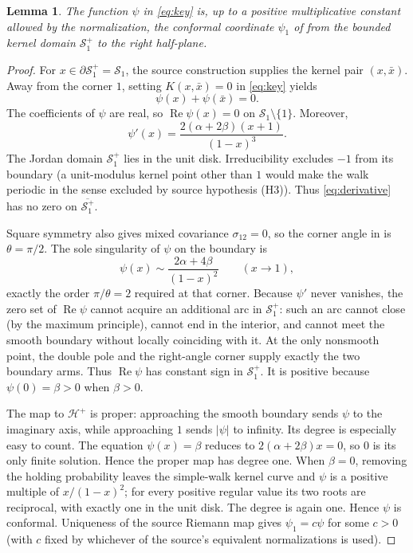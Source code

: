 \documentclass[10pt]{article}
\newtheorem{lemma}{Lemma}
\newcommand{\Sdom}{\mathcal S_1^+}
\begin{document}
\begin{lemma}\label{lem:psi}
The function $\psi$ in \eqref{eq:key} is, up to a positive multiplicative
constant allowed by the normalization, the conformal coordinate $\psi_1$ of
\cite{HRT} from the bounded kernel domain $\Sdom$ to the right half-plane.
\end{lemma}

\begin{proof}
For $x\in\partial\Sdom=\mathcal S_1$, the source construction supplies the
kernel pair $(x,\bar x)$.  Away from the corner $1$, setting $K(x,\bar x)=0$
in \eqref{eq:key} yields
\[
 \psi(x)+\psi(\bar x)=0.
\]
The coefficients of $\psi$ are real, so $\operatorname{Re}\psi(x)=0$ on
$\mathcal S_1\setminus\{1\}$.  Moreover,
\begin{equation}\label{eq:derivative}
 \psi'(x)=\frac{2(\alpha+2\beta)(x+1)}{(1-x)^3}.
\end{equation}
The Jordan domain $\Sdom$ lies in the unit disk.  Irreducibility excludes
$-1$ from its boundary (a unit-modulus kernel point other than $1$ would make
the walk periodic in the sense excluded by source hypothesis (H3)).  Thus
\eqref{eq:derivative} has no zero on $\overline{\Sdom}$.

Square symmetry also gives mixed covariance $\sigma_{12}=0$, so the corner
angle in \cite[(1.16)]{HRT} is $\theta=\pi/2$.  The sole singularity of $\psi$
on the boundary is
\[
 \psi(x)\sim\frac{2\alpha+4\beta}{(1-x)^2}\qquad(x\to1),
\]
exactly the order $\pi/\theta=2$ required at that corner.  Because $\psi'$
never vanishes, the zero set of $\operatorname{Re}\psi$ cannot acquire an
additional arc in $\Sdom$: such an arc cannot close (by the maximum
principle), cannot end in the interior, and cannot meet the smooth boundary
without locally coinciding with it.  At the only nonsmooth point, the double
pole and the right-angle corner supply exactly the two boundary arms.  Thus
$\operatorname{Re}\psi$ has constant sign in $\Sdom$.  It is positive because
$\psi(0)=\beta>0$ when $\beta>0$.

The map to $\mathcal H^+$ is proper: approaching the smooth boundary sends
$\psi$ to the imaginary axis, while approaching $1$ sends $|\psi|$ to
infinity.  Its degree is especially easy to count.  The equation
$\psi(x)=\beta$ reduces to $2(\alpha+2\beta)x=0$, so $0$ is its only finite
solution.  Hence the proper map has degree one.  When $\beta=0$, removing the
holding probability leaves the simple-walk kernel curve and $\psi$ is a
positive multiple of $x/(1-x)^2$; for every positive regular value its two
roots are reciprocal, with exactly one in the unit disk.  The degree is again
one.  Hence $\psi$ is conformal.  Uniqueness of the source Riemann map gives
$\psi_1=c\psi$ for some $c>0$ (with $c$ fixed by whichever of the source's
equivalent normalizations is used).
\end{proof}
\end{document}

